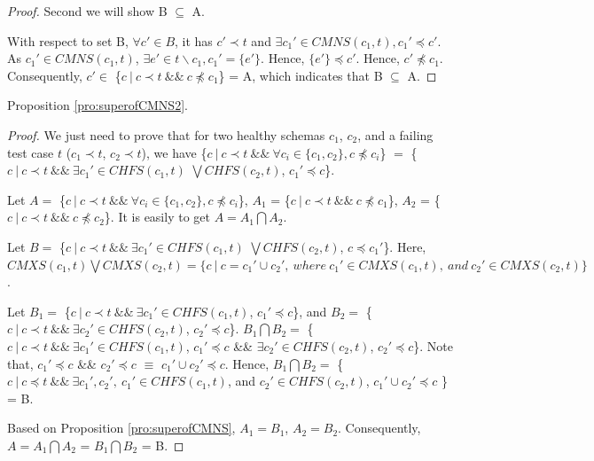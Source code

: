 {\begin{proof}
Second we will show B $\subseteq$ A.

With respect to set B, $\forall c' \in B$, it has $c' \prec t$  and $\exists c_{1}' \in CMNS(c_{1}, t), c_{1}' \preceq c'$. As $c_{1}' \in CMNS(c_{1}, t)$, $\exists e' \in  t \backslash c_{1}, c_{1}' = \{ e' \}$. Hence, $\{e'\} \preceq c'$. Hence, $c' \npreceq c_{1}$. Consequently, $c' \in $  \{$c\ |\ c \prec t\ \&\&\ c \npreceq c_{1}$\} = A, which indicates that B $\subseteq$ A.

\end{proof}


Proposition \ref{pro:superofCMNS2}.

\begin{proof}
We just need to prove that for two healthy schemas $c_{1}$, $c_{2}$, and a failing test case $t$ ($c_{1} \prec t$, $c_{2} \prec t$), we have \{$c\ |\ c \prec t\ \&\&\ \forall c_{i} \in \{c_{1}, c_{2}\}, c \npreceq c_{i} $\} $=$  \{$ c\ |\ c \prec t \ \&\&\  \exists c_{1}' \in CHFS(c_{1}, t)$ $ \bigvee CHFS(c_{2}, t)$, $c_{1}' \preceq c$\}.

Let $A = $ \{$c\ |\ c \prec t\ \&\&\ \forall c_{i} \in \{c_{1}, c_{2}\}, c \npreceq c_{i} $\}, $A_{1}$ = \{$c\ |\ c \prec t\ \&\&\  c \npreceq c_{1} $\}, $A_{2}$ = \{$c\ |\ c \prec t\ \&\&\  c \npreceq c_{2} $\}. It is easily to get $A = A_{1} \bigcap A_{2}$.

Let $B = $ \{$ c\ |\ c \prec t \ \&\&\  \exists c_{1}' \in CHFS(c_{1}, t)$ $ \bigvee CHFS(c_{2}, t)$, $c \preceq c_{1}'$\}. Here,    $ CMXS(c_{1}, t) \bigvee CMXS(c_{2}, t) = \{ c\ |\ c = c_{1}' \cup c_{2}',\ where\ c_{1}' \in CMXS(c_{1}, t),\ and\ c_{2}' \in CMXS(c_{2}, t) \}$.

Let $B_{1} = $ \{$ c\ |\ c \prec t \ \&\&\  \exists c_{1}' \in CHFS(c_{1}, t)$, $c_{1}' \preceq c$\}, and $B_{2} = $ \{$ c\ |\ c \prec t \ \&\&\  \exists c_{2}' \in CHFS(c_{2}, t)$, $c_{2}' \preceq c$\}. $B_{1} \bigcap B_{2} = $ \{$ c\ |\ c \prec t \ \&\&\  \exists c_{1}' \in CHFS(c_{1}, t)$, $c_{1}' \preceq c$ \&\& $\exists c_{2}' \in CHFS(c_{2}, t)$, $c_{2}' \preceq c$\}. Note that, $c_{1}' \preceq c $ \&\& $c_{2}' \preceq c$ $\equiv$ $c_{1}' \cup c_{2}' \preceq c$. Hence, $B_{1} \bigcap B_{2} = $ \{$ c\ |\ c \preceq t \ \&\&\  \exists c_{1}', c_{2}',\  c_{1}' \in CHFS(c_{1}, t)$, and $c_{2}' \in CHFS(c_{2}, t)$, $ c_{1}' \cup c_{2}' \preceq c$ \} = B.

Based on Proposition \ref{pro:superofCMNS}, $A_{1} = B_{1}$, $A_{2} = B_{2}$. Consequently,
$A = A_{1} \bigcap A_{2}$ = $B_{1} \bigcap B_{2}$  = B.



\end{proof}}
